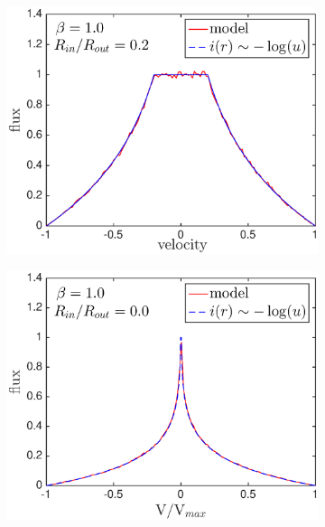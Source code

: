 \begin{figure}
\begin{subfigure}{0.5\textwidth}
\centering
\includegraphics[trim =25 40 45 15,clip=true,scale=0.46]{chapters/chapter4/images/params/A/b1_r0_2}
\end{subfigure}
\hspace{4mm}
\begin{subfigure}{0.5\textwidth}
\centering
\includegraphics[trim =72 40 45 15,clip=true,scale=0.46]{chapters/chapter4/images/params/A/b1_r0} 
\end{subfigure} \\[0.0ex]


\end{figure}

